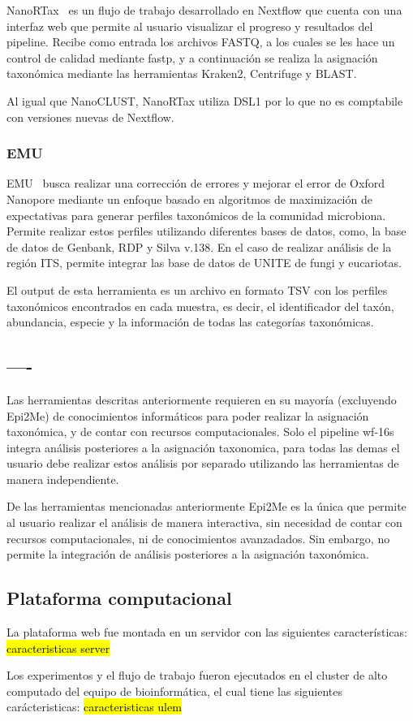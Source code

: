NanoRTax~\cite{RODRIGUEZPEREZ20225350} es un flujo de trabajo desarrollado en Nextflow que cuenta con una interfaz web que permite al usuario visualizar el progreso y resultados del pipeline.
Recibe como entrada los archivos FASTQ, a los cuales se les hace un control de calidad mediante fastp, y a continuación se realiza la asignación taxonómica mediante las herramientas Kraken2, Centrifuge y BLAST. 

Al igual que NanoCLUST, NanoRTax utiliza DSL1 por lo que no es comptabile con versiones nuevas de Nextflow.
\subsubsection{EMU}
EMU~\cite{curry2022emu} busca realizar una corrección de errores y mejorar el error de Oxford Nanopore mediante un enfoque basado en algoritmos de maximización de expectativas para generar perfiles taxonómicos de la comunidad microbiona. Permite realizar estos perfiles utilizando diferentes bases de datos, como, la base de datos de Genbank,  RDP y Silva v.138. En el caso de realizar análisis de la región ITS, permite integrar las base de datos de UNITE de fungi y eucariotas.

El output de esta herramienta es un archivo en formato TSV con los perfiles taxonómicos encontrados en cada muestra, es decir, el identificador del taxón, abundancia, especie y la información de todas las categorías taxonómicas. 


\subsection{----}
Las herramientas descritas anteriormente requieren en su mayoría (excluyendo Epi2Me) de conocimientos informáticos para poder realizar la asignación taxonómica, y de contar con recursos computacionales.
Solo el pipeline wf-16s integra análisis posteriores a la asignación taxonomica, para todas las demas el usuario debe realizar estos análisis por separado utilizando las herramientas de manera independiente.

De las herramientas mencionadas anteriormente Epi2Me es la única que permite al usuario realizar el análisis de manera interactiva, sin necesidad de contar con recursos computacionales, ni de conocimientos avanzadados. 
Sin embargo, no permite la integración de análisis posteriores a la asignación taxonómica.


\subsection{Plataforma computacional}
La plataforma web fue montada en un servidor con las siguientes características:
\hl{caracteristicas server}


Los experimentos y el flujo de trabajo fueron ejecutados en el cluster de alto computado del equipo de bioinformática, el cual tiene las siguientes carácteristicas:
\hl{caracteristicas ulem}